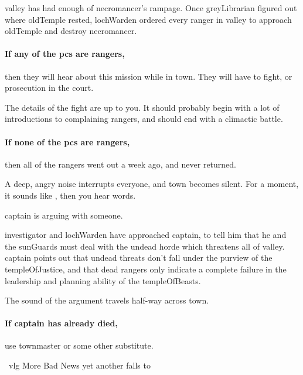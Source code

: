 \Gls{valley} has had enough of \gls{necromancer}'s rampage.
Once \gls{greyLibrarian} figured out where \gls{oldTemple} rested, \gls{lochWarden} ordered every \gls{ranger} in \gls{valley} to approach \gls{oldTemple} and destroy \gls{necromancer}.

\paragraph{If any of the \glspl{pc} are \glspl{ranger},}
then they will hear about this mission while in \gls{town}.
They will have to fight, or prosecution in the \gls{court}.

The details of the fight are up to you.
It should probably begin with a lot of introductions to complaining \glspl{ranger}, and should end with a climactic battle.

\paragraph{If none of the \glspl{pc} are \glspl{ranger},}
then all of the \glspl{ranger} went out a week ago, and never returned.

\begin{boxtext}
  A deep, angry noise interrupts everyone, and \gls{town} becomes silent.
  For a moment, it sounds like , then you hear words.

  \Gls{captain} is arguing with someone.
\end{boxtext}

\Gls{investigator} and \gls{lochWarden} have approached \gls{captain}, to tell him that he and the \glspl{sunGuard} must deal with the undead horde which threatens all of \gls{valley}.
\Gls{captain} points out that undead threats don't fall under the purview of the \gls{templeOfJustice}, and that dead \glspl{ranger} only indicate a complete failure in the leadership and planning ability of the \gls{templeOfBeasts}.

The sound of the argument travels half-way across \gls{town}.

\paragraph{If \gls{captain} has already died,}
use \gls{townmaster} or some other substitute.

{\squash~\gls{vlg} More Bad News}%
{yet another  falls to }%

